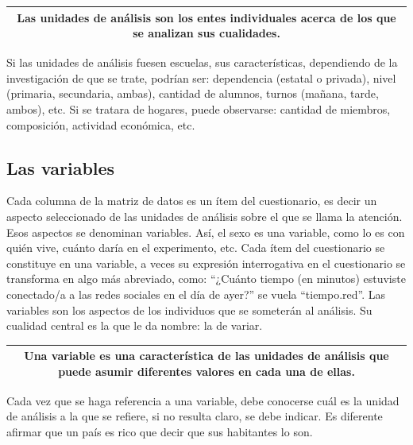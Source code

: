 \documentclass[]{book}
\begin{document}
\begin{longtable}[]{@{}c@{}}
\toprule
\endhead
\begin{minipage}[t]{0.97\columnwidth}\centering
Las \textbf{unidades de análisis} son los entes individuales acerca de los que se analizan sus cualidades.\strut
\end{minipage}\tabularnewline
\bottomrule
\end{longtable}

Si las unidades de análisis fuesen escuelas, sus características, dependiendo de la investigación de que se trate, podrían ser: dependencia (estatal o privada), nivel (primaria, secundaria, ambas), cantidad de alumnos, turnos (mañana, tarde, ambos), etc. Si se tratara de hogares, puede observarse: cantidad de miembros, composición, actividad económica, etc.

\hypertarget{las-variables}{%
\subsection{Las variables}\label{las-variables}}

Cada columna de la matriz de datos es un ítem del cuestionario, es decir un aspecto seleccionado de las unidades de análisis sobre el que se llama la atención. Esos aspectos se denominan variables. Así, el sexo es una variable, como lo es con quién vive, cuánto daría en el experimento, etc. Cada ítem del cuestionario se constituye en una variable, a veces su expresión interrogativa en el cuestionario se transforma en algo más abreviado, como: ``¿Cuánto tiempo (en minutos) estuviste conectado/a a las redes sociales en el día de ayer?'' se vuela ``tiempo.red''. Las variables son los aspectos de los individuos que se someterán al análisis. Su cualidad central es la que le da nombre: la de variar.

\begin{longtable}[]{@{}c@{}}
\toprule
\endhead
\begin{minipage}[t]{0.97\columnwidth}\centering
Una \textbf{variable} es una característica de las unidades de análisis que puede asumir diferentes valores en cada una de ellas.\strut
\end{minipage}\tabularnewline
\bottomrule
\end{longtable}

Cada vez que se haga referencia a una variable, debe conocerse cuál es la unidad de análisis a la que se refiere, si no resulta claro, se debe indicar. Es diferente afirmar que un país es rico que decir que sus habitantes lo son.
\end{document}

